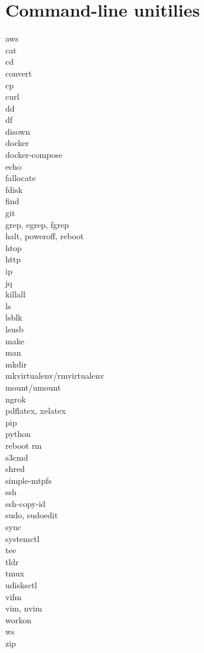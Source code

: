 \documentclass [8pt] {extarticle}
\begin{document}
    \section {Command-line unitilies}

    aws \\
    cat \\
    cd \\
    convert \\
    cp \\
    curl \\
    dd \\
    df \\
    disown  \\
    docker \\
    docker-compose \\
    echo \\
    fallocate \\
    fdisk \\
    find \\
    git \\
    grep, egrep, fgrep \\
    halt, poweroff, reboot \\
    htop \\
    http \\
    ip \\
    jq \\
    killall \\
    ls \\
    lsblk \\
    lsusb \\
    make \\
    man \\
    mkdir \\
    mkvirtualenv/rmvirtualenv \\
    mount/umount \\
    ngrok \\
    pdflatex, xelatex \\
    pip \\
    python \\
    reboot
    rm \\
    s3cmd \\
    shred \\
    simple-mtpfs \\
    ssh \\
    ssh-copy-id \\
    sudo, sudoedit \\
    sync \\
    systemctl \\
    tee \\
    tldr \\
    tmux \\
    udisksctl \\
    vifm \\
    vim, nvim \\
    workon \\
    ws \\
    zip \\
\end{document}
